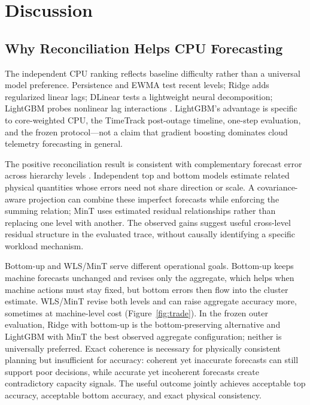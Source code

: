 \documentclass[a4paper,fleqn]{cas-dc}
\begin{document}

\FloatBarrier

\section{Discussion}
\label{sec:discussion}

\subsection{Why Reconciliation Helps {CPU} Forecasting}
\label{sec:disc-cpu}
The independent {CPU} ranking reflects baseline difficulty rather than a
universal model preference.
Persistence and {EWMA} test recent levels; Ridge adds regularized linear lags;
DLinear tests a lightweight neural decomposition; LightGBM probes nonlinear
lag interactions \cite{ke2017lightgbm,zeng2023dlinear}.
LightGBM's advantage is specific to core-weighted {CPU}, the TimeTrack
post-outage timeline, one-step evaluation, and the frozen protocol---not a claim
that gradient boosting dominates cloud telemetry forecasting in general.

The positive reconciliation result is consistent with complementary forecast
error across hierarchy levels
\cite{hyndman2011optimal,wickramasuriya2019mint,athanasopoulos2024hierarchical}.
Independent top and bottom models estimate related physical quantities whose
errors need not share direction or scale.
A covariance-aware projection can combine these imperfect forecasts while
enforcing the summing relation; MinT uses estimated residual relationships rather
than replacing one level with another.
The observed gains suggest useful cross-level residual structure in the
evaluated trace, without causally identifying a specific workload mechanism.

Bottom-up and {WLS}/MinT serve different operational goals.
Bottom-up keeps machine forecasts unchanged and revises only the aggregate,
which helps when machine actions must stay fixed, but bottom errors then flow
into the cluster estimate.
{WLS}/MinT revise both levels and can raise aggregate accuracy more, sometimes
at machine-level cost (Figure~\ref{fig:trade}).
In the frozen outer evaluation, Ridge with bottom-up is the bottom-preserving
alternative and LightGBM with MinT the best observed aggregate configuration;
neither is universally preferred.
Exact coherence is necessary for physically consistent planning but insufficient
for accuracy: coherent yet inaccurate forecasts can still support poor decisions,
while accurate yet incoherent forecasts create contradictory capacity signals.
The useful outcome jointly achieves acceptable top accuracy, acceptable bottom
accuracy, and exact physical consistency.
\end{document}
